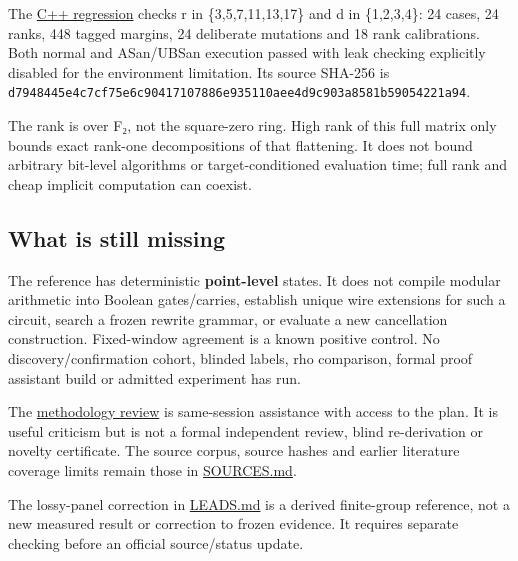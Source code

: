 \documentclass[
  10pt,
]{article}
\begin{document}
The \href{window-control.cpp}{C++ regression} checks r in
\{3,5,7,11,13,17\} and d in \{1,2,3,4\}: 24 cases, 24 ranks, 448 tagged
margins, 24 deliberate mutations and 18 rank calibrations. Both normal
and ASan/UBSan execution passed with leak checking explicitly disabled
for the environment limitation. Its source SHA-256 is
\texttt{d7948445e4c7cf75e6c90417107886e935110aee4d9c903a8581b59054221a94}.

The rank is over F₂, not the square-zero ring. High rank of this full
matrix only bounds exact rank-one decompositions of that flattening. It
does not bound arbitrary bit-level algorithms or target-conditioned
evaluation time; full rank and cheap implicit computation can coexist.

\subsection{What is still missing}\label{what-is-still-missing}

The reference has deterministic \textbf{point-level} states. It does not
compile modular arithmetic into Boolean gates/carries, establish unique
wire extensions for such a circuit, search a frozen rewrite grammar, or
evaluate a new cancellation construction. Fixed-window agreement is a
known positive control. No discovery/confirmation cohort, blinded
labels, rho comparison, formal proof assistant build or admitted
experiment has run.

The \href{methodology-review.md}{methodology review} is same-session
assistance with access to the plan. It is useful criticism but is not a
formal independent review, blind re-derivation or novelty certificate.
The source corpus, source hashes and earlier literature coverage limits
remain those in \href{../SOURCES.md}{SOURCES.md}.

The lossy-panel correction in \url{LEADS.md} is a derived finite-group
reference, not a new measured result or correction to frozen evidence.
It requires separate checking before an official source/status update.
\end{document}
